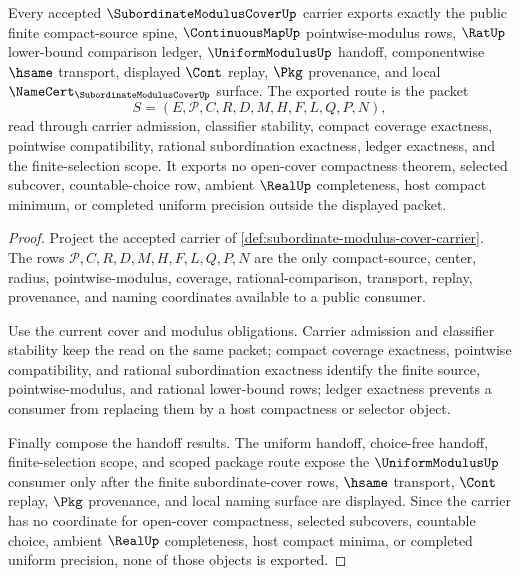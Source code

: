 \begin{theorem}
\label{thm:subordinate-modulus-cover-public-export}
Every accepted $\SubordinateModulusCoverUp$ carrier exports exactly the public finite compact-source spine, $\ContinuousMapUp$ pointwise-modulus rows, $\RatUp$ lower-bound comparison ledger, $\UniformModulusUp$ handoff, componentwise $\hsame$ transport, displayed $\Cont$ replay, $\Pkg$ provenance, and local $\NameCert_{\SubordinateModulusCoverUp}$ surface. The exported route is the packet
$$
S=(E,\mathcal{P},C,R,D,M,H,F,L,Q,P,N),
$$
read through carrier admission, classifier stability, compact coverage exactness, pointwise compatibility, rational subordination exactness, ledger exactness, and the finite-selection scope. It exports no open-cover compactness theorem, selected subcover, countable-choice row, ambient $\RealUp$ completeness, host compact minimum, or completed uniform precision outside the displayed packet.
\end{theorem}
\begin{proof}
Project the accepted carrier of \autoref{def:subordinate-modulus-cover-carrier}. The rows $\mathcal{P},C,R,D,M,H,F,L,Q,P,N$ are the only compact-source, center, radius, pointwise-modulus, coverage, rational-comparison, transport, replay, provenance, and naming coordinates available to a public consumer.

Use the current cover and modulus obligations. Carrier admission and classifier stability keep the read on the same packet; compact coverage exactness, pointwise compatibility, and rational subordination exactness identify the finite source, pointwise-modulus, and rational lower-bound rows; ledger exactness prevents a consumer from replacing them by a host compactness or selector object.

Finally compose the handoff results. The uniform handoff, choice-free handoff, finite-selection scope, and scoped package route expose the $\UniformModulusUp$ consumer only after the finite subordinate-cover rows, $\hsame$ transport, $\Cont$ replay, $\Pkg$ provenance, and local naming surface are displayed. Since the carrier has no coordinate for open-cover compactness, selected subcovers, countable choice, ambient $\RealUp$ completeness, host compact minima, or completed uniform precision, none of those objects is exported.
\end{proof}

